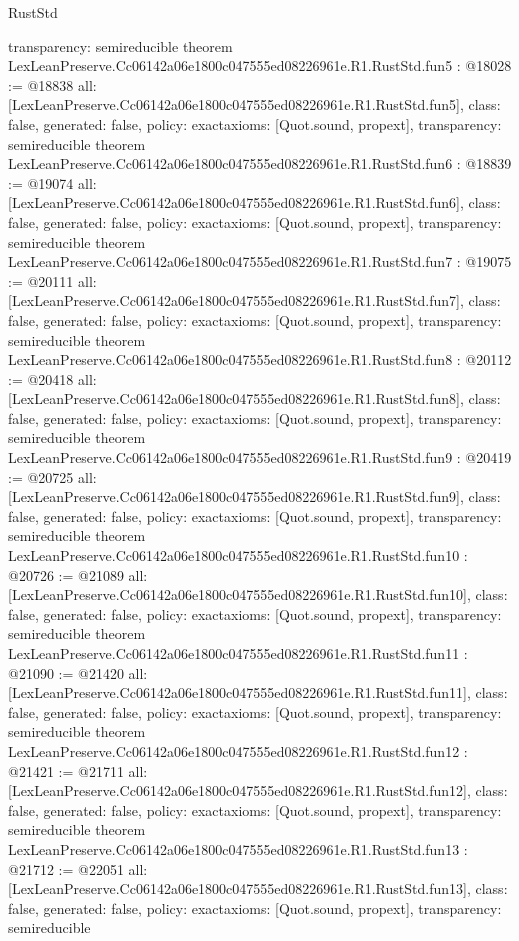 \begin{lexlean}{RustStd}
\begin{coremodule}
{  transparency: semireducible
}
theorem LexLeanPreserve.Cc06142a06e1800c047555ed08226961e.R1.RustStd.fun5 : @18028 := @18838 {
  all: [LexLeanPreserve.Cc06142a06e1800c047555ed08226961e.R1.RustStd.fun5],
  class: false,
  generated: false,
  policy: exact{axioms: [Quot.sound, propext]},
  transparency: semireducible
}
theorem LexLeanPreserve.Cc06142a06e1800c047555ed08226961e.R1.RustStd.fun6 : @18839 := @19074 {
  all: [LexLeanPreserve.Cc06142a06e1800c047555ed08226961e.R1.RustStd.fun6],
  class: false,
  generated: false,
  policy: exact{axioms: [Quot.sound, propext]},
  transparency: semireducible
}
theorem LexLeanPreserve.Cc06142a06e1800c047555ed08226961e.R1.RustStd.fun7 : @19075 := @20111 {
  all: [LexLeanPreserve.Cc06142a06e1800c047555ed08226961e.R1.RustStd.fun7],
  class: false,
  generated: false,
  policy: exact{axioms: [Quot.sound, propext]},
  transparency: semireducible
}
theorem LexLeanPreserve.Cc06142a06e1800c047555ed08226961e.R1.RustStd.fun8 : @20112 := @20418 {
  all: [LexLeanPreserve.Cc06142a06e1800c047555ed08226961e.R1.RustStd.fun8],
  class: false,
  generated: false,
  policy: exact{axioms: [Quot.sound, propext]},
  transparency: semireducible
}
theorem LexLeanPreserve.Cc06142a06e1800c047555ed08226961e.R1.RustStd.fun9 : @20419 := @20725 {
  all: [LexLeanPreserve.Cc06142a06e1800c047555ed08226961e.R1.RustStd.fun9],
  class: false,
  generated: false,
  policy: exact{axioms: [Quot.sound, propext]},
  transparency: semireducible
}
theorem LexLeanPreserve.Cc06142a06e1800c047555ed08226961e.R1.RustStd.fun10 : @20726 := @21089 {
  all: [LexLeanPreserve.Cc06142a06e1800c047555ed08226961e.R1.RustStd.fun10],
  class: false,
  generated: false,
  policy: exact{axioms: [Quot.sound, propext]},
  transparency: semireducible
}
theorem LexLeanPreserve.Cc06142a06e1800c047555ed08226961e.R1.RustStd.fun11 : @21090 := @21420 {
  all: [LexLeanPreserve.Cc06142a06e1800c047555ed08226961e.R1.RustStd.fun11],
  class: false,
  generated: false,
  policy: exact{axioms: [Quot.sound, propext]},
  transparency: semireducible
}
theorem LexLeanPreserve.Cc06142a06e1800c047555ed08226961e.R1.RustStd.fun12 : @21421 := @21711 {
  all: [LexLeanPreserve.Cc06142a06e1800c047555ed08226961e.R1.RustStd.fun12],
  class: false,
  generated: false,
  policy: exact{axioms: [Quot.sound, propext]},
  transparency: semireducible
}
theorem LexLeanPreserve.Cc06142a06e1800c047555ed08226961e.R1.RustStd.fun13 : @21712 := @22051 {
  all: [LexLeanPreserve.Cc06142a06e1800c047555ed08226961e.R1.RustStd.fun13],
  class: false,
  generated: false,
  policy: exact{axioms: [Quot.sound, propext]},
  transparency: semireducible
}
\end{coremodule}
\end{lexlean}
